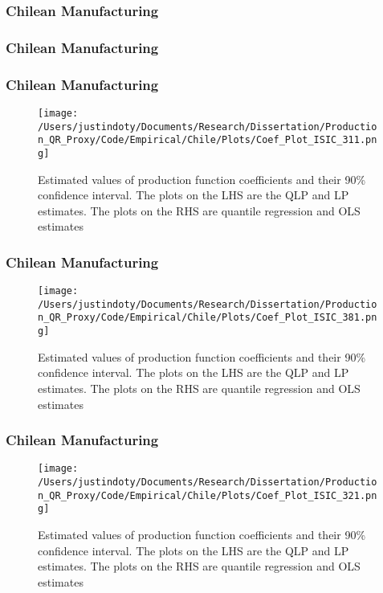 \documentclass{beamer}
\begin{document}

\begin{frame}
\frametitle{Chilean Manufacturing}
\scriptsize

\end{frame}

\begin{frame}
\frametitle{Chilean Manufacturing}
\scriptsize

\end{frame}

\begin{frame}
\frametitle{Chilean Manufacturing}
\begin{figure}[ht]
\centering
\texttt{[image: /Users/justindoty/Documents/Research/Dissertation/Production\_QR\_Proxy/Code/Empirical/Chile/Plots/Coef\_Plot\_ISIC\_311.png]}
\caption{Estimated values of production function coefficients and their 90\% confidence interval. The plots on the LHS are the QLP and LP estimates. The plots on the RHS are quantile regression and OLS estimates}
\end{figure}
\end{frame}

\begin{frame}
\frametitle{Chilean Manufacturing}
\begin{figure}[ht]
\centering
\texttt{[image: /Users/justindoty/Documents/Research/Dissertation/Production\_QR\_Proxy/Code/Empirical/Chile/Plots/Coef\_Plot\_ISIC\_381.png]}
\caption{Estimated values of production function coefficients and their 90\% confidence interval. The plots on the LHS are the QLP and LP estimates. The plots on the RHS are quantile regression and OLS estimates}
\end{figure}
\end{frame}

\begin{frame}
\frametitle{Chilean Manufacturing}
\begin{figure}[ht]
\centering
\texttt{[image: /Users/justindoty/Documents/Research/Dissertation/Production\_QR\_Proxy/Code/Empirical/Chile/Plots/Coef\_Plot\_ISIC\_321.png]}
\caption{Estimated values of production function coefficients and their 90\% confidence interval. The plots on the LHS are the QLP and LP estimates. The plots on the RHS are quantile regression and OLS estimates}
\end{figure}
\end{frame}
\end{document}

